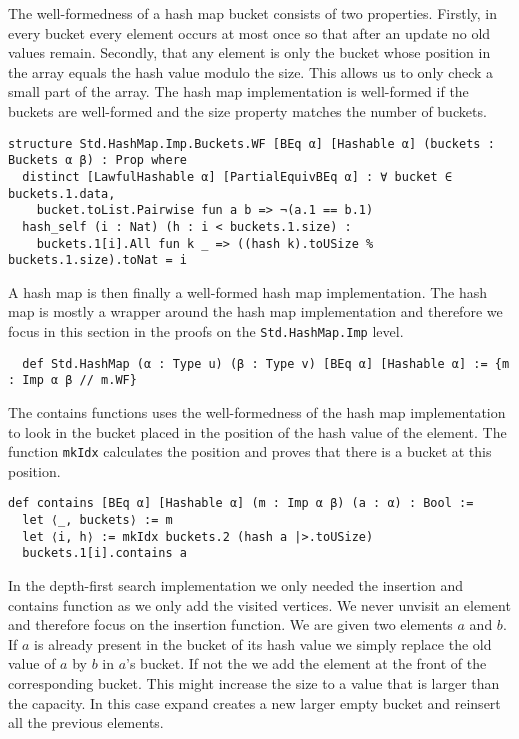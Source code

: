 The well-formedness of a hash map bucket consists of two properties. Firstly, in every bucket every element occurs at most once so that after an update no old values remain. Secondly, that any element is only the bucket whose position in the array equals the hash value modulo the size. This allows us to only check a small part of the array. The hash map implementation is well-formed if the buckets are well-formed and the size property matches the number of buckets.

\begin{lstlisting}
structure Std.HashMap.Imp.Buckets.WF [BEq α] [Hashable α] (buckets : Buckets α β) : Prop where
  distinct [LawfulHashable α] [PartialEquivBEq α] : ∀ bucket ∈ buckets.1.data,
    bucket.toList.Pairwise fun a b => ¬(a.1 == b.1)
  hash_self (i : Nat) (h : i < buckets.1.size) :
    buckets.1[i].All fun k _ => ((hash k).toUSize % buckets.1.size).toNat = i
\end{lstlisting}

A hash map is then finally a well-formed hash map implementation. The hash map is mostly a wrapper around the hash map implementation and therefore we focus in this section in the proofs on the \lstinline|Std.HashMap.Imp| level.

\begin{lstlisting}
  def Std.HashMap (α : Type u) (β : Type v) [BEq α] [Hashable α] := {m : Imp α β // m.WF}
\end{lstlisting}

The contains functions uses the well-formedness of the hash map implementation to look in the bucket placed in the position of the hash value of the element. The function \lstinline|mkIdx| calculates the position and proves that there is a bucket at this position.

\begin{lstlisting}
def contains [BEq α] [Hashable α] (m : Imp α β) (a : α) : Bool :=
  let ⟨_, buckets⟩ := m
  let ⟨i, h⟩ := mkIdx buckets.2 (hash a |>.toUSize)
  buckets.1[i].contains a
\end{lstlisting}

In the depth-first search implementation we only needed the insertion and contains function as we only add the visited vertices. We never unvisit an element and therefore focus on the insertion function. We are given two elements $a$ and $b$. If $a$ is already present in the bucket of its hash value we simply replace the old value of $a$ by $b$ in $a$'s bucket. If not the we add the element at the front of the corresponding bucket. This might increase the size to a value that is larger than the capacity. In this case expand creates a new larger empty bucket and reinsert all the previous elements.

